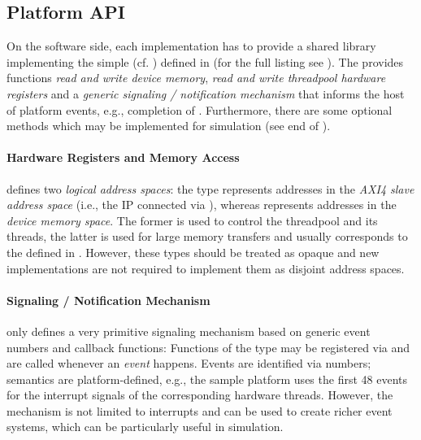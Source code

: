 \subsection{Platform API}\label{sec:pi-papi}%
On the software side, each  implementation has to provide a shared library implementing the simple  (cf. ) defined in  (for the full listing see ).
The  provides functions \emph{read and write device memory}, \emph{read and write threadpool hardware registers} and a \emph{generic signaling / notification mechanism} that informs the host of platform events, e.g., completion of .
Furthermore, there are some optional methods which may be implemented for simulation (see end of ).

\paragraph{Hardware Registers and Memory Access}
 defines two \emph{logical address spaces}: the type  represents addresses in the \emph{AXI4 slave address space} (i.e., the IP connected via ), whereas  represents addresses in the \emph{device memory space}.
The former is used to control the threadpool and its threads, the latter is used for large memory transfers and usually corresponds to the  defined in .
However, these types should be treated as opaque and new  implementations are not required to implement them as disjoint address spaces.

\paragraph{Signaling / Notification Mechanism}
 only defines a very primitive signaling mechanism based on generic event numbers and callback functions:
Functions of the type  may be registered via  and are called whenever an \emph{event} happens.
Events are identified via numbers; semantics are platform-defined, e.g., the sample  platform uses the first 48 events for the interrupt signals of the corresponding hardware threads.
However, the mechanism is not limited to interrupts and can be used to create richer event systems, which can be particularly useful in simulation.

